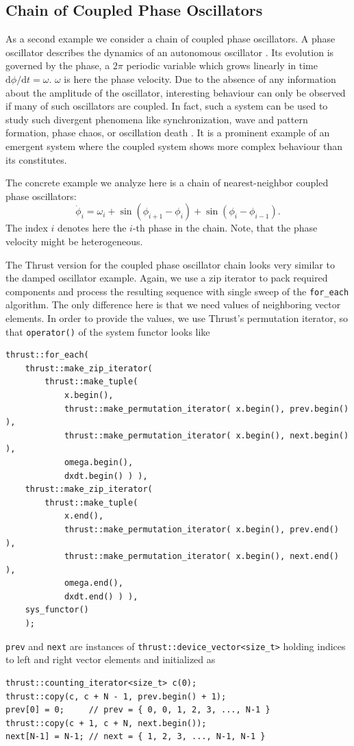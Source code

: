 \documentclass[1p]{elsarticle}
\newcommand{\code}[1]{\lstinline|#1|}
\newcommand {\de} {\mbox{d}}
\begin{document}
%
%
\subsection{Chain of Coupled Phase Oscillators}

As a second example we consider a chain of coupled phase oscillators. A
phase oscillator describes the dynamics of an autonomous oscillator
\cite{Synchronization-Pikovsky,Kuramoto-84}. Its evolution is
governed by the phase, a $2\pi$ periodic variable which grows linearly
in time $\de \phi / \de t = \omega$. $\omega$ is here the phase
velocity. Due to the absence of any information about the amplitude of
the oscillator, interesting behaviour can only be observed if many of
such oscillators are coupled. In fact, such a system can be used to study
such divergent phenomena like synchronization, wave and pattern
formation, phase chaos, or oscillation death \cite{}. It is a
prominent example of an emergent system where the coupled system shows
more complex behaviour than its constitutes.

The concrete example we analyze here is a chain of nearest-neighbor
coupled phase oscillators:
\begin{equation} \label{eq:phasesystem}
    \dot{\phi}_i = \omega_i + \sin( \phi_{i+1} - \phi_i) + \sin( \phi_i
    - \phi_{i-1}).
\end{equation}
The index $i$ denotes here the $i$-th phase in the chain. Note, that
the phase velocity might be heterogeneous.

The Thrust version for the coupled phase oscillator chain looks very similar to
the damped oscillator example. Again, we use a zip iterator to pack required
components and process the resulting sequence with single sweep of the
\code{for_each} algorithm. The only difference here is that we need values of
neighboring vector elements. In order to provide the values, we use Thrust's
permutation iterator, so that \code{operator()} of the system functor looks
like
\begin{lstlisting}
thrust::for_each(
    thrust::make_zip_iterator(
        thrust::make_tuple(
            x.begin(),
            thrust::make_permutation_iterator( x.begin(), prev.begin() ),
            thrust::make_permutation_iterator( x.begin(), next.begin() ),
            omega.begin(),
            dxdt.begin() ) ),
    thrust::make_zip_iterator(
        thrust::make_tuple(
            x.end(),
            thrust::make_permutation_iterator( x.begin(), prev.end() ),
            thrust::make_permutation_iterator( x.begin(), next.end() ),
            omega.end(),
            dxdt.end() ) ),
    sys_functor()
    );
\end{lstlisting}
\code{prev} and \code{next} are instances of
\code{thrust::device_vector<size_t>} holding indices to left and right vector
elements and initialized as
\begin{lstlisting}
thrust::counting_iterator<size_t> c(0);
thrust::copy(c, c + N - 1, prev.begin() + 1);
prev[0] = 0;     // prev = { 0, 0, 1, 2, 3, ..., N-1 }
thrust::copy(c + 1, c + N, next.begin());
next[N-1] = N-1; // next = { 1, 2, 3, ..., N-1, N-1 }
\end{lstlisting}
\end{document}
